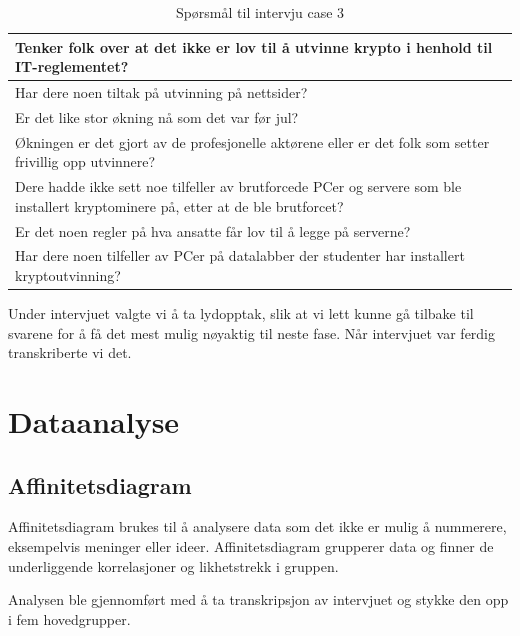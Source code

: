 \begin{table}[H]
\begin{tabular}{|m{30em}|}
          \hline
          Tenker folk over at det ikke er lov til å utvinne krypto i henhold til IT-reglementet? \\
          \hline
          Har dere noen tiltak på utvinning på nettsider? \\
          \hline
          Er det like stor økning nå som det var før jul? \\
          \hline
          Økningen er det gjort av de profesjonelle aktørene eller er det folk som setter frivillig opp utvinnere? \\
          \hline
          Dere hadde ikke sett noe tilfeller av brutforcede PCer og servere som ble installert kryptominere på, etter at de ble brutforcet?  \\
          \hline
          Er det noen regler på hva ansatte får lov til å legge på serverne? \\
          \hline
          Har dere noen tilfeller av PCer på datalabber der studenter har installert kryptoutvinning?
          \hline
    \end{tabular}
    \caption{Spørsmål til intervju case 3}
    \label{tab:spm-intervju}
\end{table}
Under intervjuet valgte vi å ta lydopptak, slik at vi lett kunne gå tilbake til svarene for å få det mest mulig nøyaktig til neste fase. Når intervjuet var ferdig transkriberte vi det.
\section{Dataanalyse}
\subsection{Affinitetsdiagram}
Affinitetsdiagram brukes til å analysere data som det ikke er mulig å nummerere, eksempelvis meninger eller ideer. Affinitetsdiagram grupperer data og finner de underliggende korrelasjoner og likhetstrekk i gruppen.

Analysen ble gjennomført med å ta transkripsjon av intervjuet og stykke den opp i fem hovedgrupper.     

